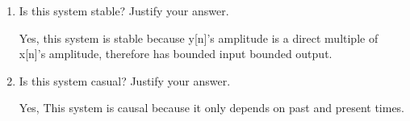 \documentclass{article}
\begin{document}
\begin{enumerate}
\begin{enumerate}
\begin{center}
        \end{center}
        \item Is this system stable? Justify your answer.
        \begin{center}
            Yes, this system is stable because y[n]'s amplitude is a direct multiple of x[n]'s amplitude, therefore has bounded input bounded output.
        \end{center}
        \item Is this system casual? Justify your answer.
        \begin{center}
            Yes, This system is causal because it only depends on past and present times.
        \end{center}
    \end{enumerate}
\end{enumerate}
\end{document}
